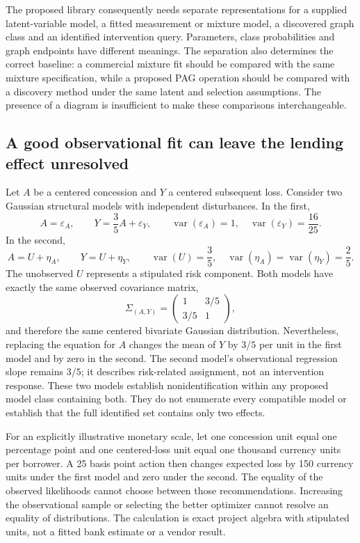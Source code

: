 The proposed library consequently needs separate representations for a
supplied latent-variable model, a fitted measurement or mixture model, a
discovered graph class and an identified intervention query. Parameters,
class probabilities and graph endpoints have different meanings. The
separation also determines the correct baseline: a commercial mixture
fit should be compared with the same mixture specification, while a
proposed PAG operation should be compared with a discovery method under
the same latent and selection assumptions. The presence of a diagram is
insufficient to make these comparisons interchangeable.

\hypertarget{a-good-observational-fit-can-leave-the-lending-effect-unresolved}{%
\subsection{A good observational fit can leave the lending effect
unresolved}\label{a-good-observational-fit-can-leave-the-lending-effect-unresolved}}

Let \(A\) be a centered concession and \(Y\) a centered subsequent loss.
Consider two Gaussian structural models with independent disturbances.
In the first, \[
 A=\varepsilon_A,\qquad
 Y=\frac35 A+\varepsilon_Y,\qquad
 \operatorname{var}(\varepsilon_A)=1,\quad
 \operatorname{var}(\varepsilon_Y)=\frac{16}{25}.
\] In the second, \[
 A=U+\eta_A,\qquad Y=U+\eta_Y,\qquad
 \operatorname{var}(U)=\frac35,\quad
 \operatorname{var}(\eta_A)=\operatorname{var}(\eta_Y)=\frac25.
\] The unobserved \(U\) represents a stipulated risk component. Both
models have exactly the same observed covariance matrix, \[
 \Sigma_{(A,Y)}=
 \begin{pmatrix}1&3/5\\3/5&1\end{pmatrix},
\] and therefore the same centered bivariate Gaussian distribution.
Nevertheless, replacing the equation for \(A\) changes the mean of \(Y\)
by \(3/5\) per unit in the first model and by zero in the second. The
second model's observational regression slope remains \(3/5\); it
describes risk-related assignment, not an intervention response. These
two models establish nonidentification within any proposed model class
containing both. They do not enumerate every compatible model or
establish that the full identified set contains only two effects.
\citep{exec13_latent_examples}

For an explicitly illustrative monetary scale, let one concession unit
equal one percentage point and one centered-loss unit equal one thousand
currency units per borrower. A 25 basis point action then changes
expected loss by 150 currency units under the first model and zero under
the second. The equality of the observed likelihoods cannot choose
between those recommendations. Increasing the observational sample or
selecting the better optimizer cannot resolve an equality of
distributions. The calculation is exact project algebra with stipulated
units, not a fitted bank estimate or a vendor result.
\citep{exec13_latent_examples}

